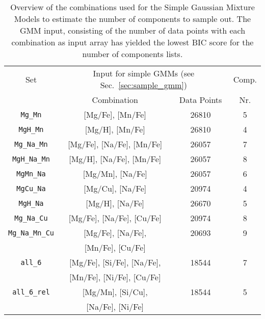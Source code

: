 \begin{table}
\centering
\caption{Overview of the combinations used for the Simple Gaussian Mixture Models to estimate the number of components to sample out. The GMM input, consisting of the number of data points with each combination as input array has yielded the lowest BIC score for the number of components lists.}
\label{tab:sample_gmm}
\begin{tabular}{cccc}
\hline \hline
Set & \multicolumn{2}{c}{Input for simple GMMs (see Sec.~\ref{sec:sample_gmm})} & Comp. \\
 & Combination & Data Points & Nr. \\
\hline
\texttt{Mg\_Mn}   & [Mg/Fe], [Mn/Fe]  & 26810 & 5 \\
\texttt{MgH\_Mn}  & [Mg/H], [Mn/Fe]   & 26810 & 4 \\
\texttt{Mg\_Na\_Mn}  & [Mg/Fe], [Na/Fe], [Mn/Fe] & 26057 & 7 \\
\texttt{MgH\_Na\_Mn} & [Mg/H], [Na/Fe], [Mn/Fe] & 26057 & 8 \\
\texttt{MgMn\_Na}  & [Mg/Mn], [Na/Fe]  & 26057 & 6 \\
\texttt{MgCu\_Na}  & [Mg/Cu], [Na/Fe]  & 20974 & 4 \\
\hline
\texttt{MgH\_Na}  & [Mg/H], [Na/Fe]   & 26670 & 5 \\
\texttt{Mg\_Na\_Cu}  & [Mg/Fe], [Na/Fe], [Cu/Fe] & 20974 & 8 \\
\texttt{Mg\_Na\_Mn\_Cu} & [Mg/Fe], [Na/Fe],   & 20693 & 9 \\
     & [Mn/Fe], [Cu/Fe]  &   &  \\
\texttt{all\_6}   & [Mg/Fe], [Si/Fe], [Na/Fe], & 18544 & 7 \\
     & [Mn/Fe], [Ni/Fe], [Cu/Fe] &   &  \\
\texttt{all\_6\_rel}  & [Mg/Mn], [Si/Cu],  & 18544 & 5 \\
     & [Na/Fe], [Ni/Fe]   &   &  \\
   \hline
\end{tabular}
\end{table}
